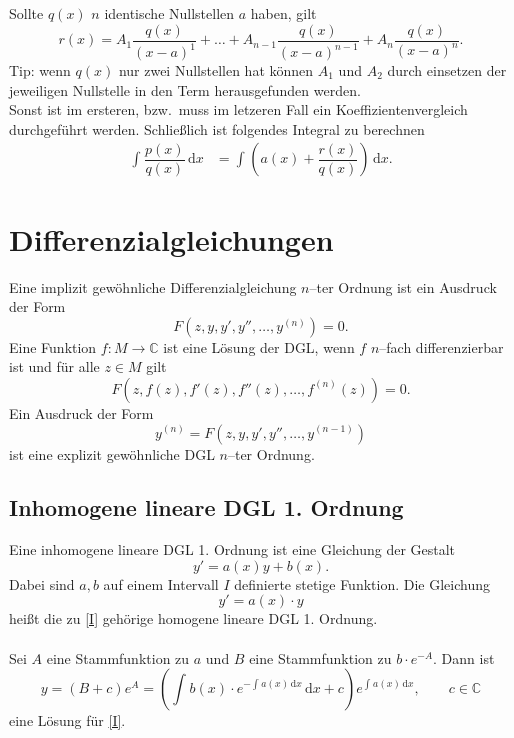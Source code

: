 \documentclass[a4paper,12pt]{article}
\newcommand{\td}{\,\text{d}}
\begin{document}
Sollte $q\left(x\right)$ $n$ identische Nullstellen $a$ haben, gilt
\[ 
        r\left(x\right)=A_1\dfrac{q\left(x\right)}{\left(x-a\right)^1}+\hdots+A_{n-1}\dfrac{q\left(x\right)}{\left(x-a\right)^{n-1}}+A_n\dfrac{q\left(x\right)}{\left(x-a\right)^n}
.\]
Tip: wenn $q\left(x\right)$ nur zwei Nullstellen hat können $A_1$ und $A_2$ durch einsetzen der jeweiligen Nullstelle in den Term herausgefunden werden.\\
Sonst ist im ersteren, bzw.\ muss im letzeren Fall ein Koeffizientenvergleich durchgeführt werden. Schließlich ist folgendes Integral zu berechnen
\begin{align*}
        \int_{}^{}\dfrac{p\left(x\right)}{q\left(x\right)}\td x&=\int_{}^{}\left(a\left(x\right)+\dfrac{r\left(x\right)}{q\left(x\right)}\right)\td x
.\end{align*}
\section{Differenzialgleichungen}
Eine implizit gewöhnliche Differenzialgleichung $n$--ter Ordnung ist ein Ausdruck der Form
\[ 
        F\left(z,y,y',y'',\hdots ,y^{\left(n\right)}\right)=0
.\] 
Eine Funktion $f:M\rightarrow \mathbb{C}$ ist eine Lösung der DGL, wenn $f$ $n$--fach differenzierbar ist und für alle $z \in M$ gilt
\[ 
        F\left(z,f\left(z\right),f'\left(z\right),f''\left(z\right),\hdots ,f^{\left(n\right)}\left(z\right)\right)=0
.\] 
Ein Ausdruck der Form
\[ 
        y^{\left(n\right)}=F\left(z,y,y',y'',\hdots ,y^{\left(n-1\right)}\right)
\] 
ist eine explizit gewöhnliche DGL $n$--ter Ordnung.

\subsection{Inhomogene lineare DGL 1. Ordnung}
Eine inhomogene lineare DGL 1. Ordnung ist eine Gleichung der Gestalt
\[ 
        y'=a\left(x\right)y+b\left(x\right)\tag{I}\label{I}
.\] 
Dabei sind $a,b$ auf einem Intervall $I$ definierte stetige Funktion. Die Gleichung
\[ 
        y'=a\left(x\right)\cdot y
\] 
heißt die zu \eqref{I} gehörige homogene lineare DGL 1. Ordnung.\\\\
Sei $A$ eine Stammfunktion zu $a$ und $B$ eine Stammfunktion zu $b \cdot e^{-A}$. Dann ist
\[ 
        y=\left(B+c\right)e^{A}=\left(\int_{}^{}b\left(x\right)\cdot e^{-\int_{}^{}a\left(x\right)\td x}\td x+c\right)e^{\int_{}^{}a\left(x\right)\td x},\qquad c \in \mathbb{C}
\] 
eine Lösung für \eqref{I}.
\end{document}
